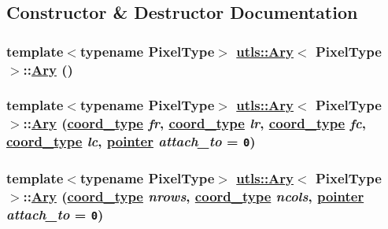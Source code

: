 \subsection{Constructor \& Destructor Documentation}
\hypertarget{structutls_1_1Ary_2c088eda97ba856c1de2555860dc0efc}{
\subsubsection[Ary]{\setlength{\rightskip}{0pt plus 5cm}template$<$typename Pixel\-Type$>$ \hyperlink{structutls_1_1Ary}{utls::Ary}$<$ Pixel\-Type $>$::\hyperlink{structutls_1_1Ary}{Ary} ()}}
\label{structutls_1_1Ary_2c088eda97ba856c1de2555860dc0efc}


\hypertarget{structutls_1_1Ary_d03b3a2394949e4f97d968ad9037dfe6}{
\subsubsection[Ary]{\setlength{\rightskip}{0pt plus 5cm}template$<$typename Pixel\-Type$>$ \hyperlink{structutls_1_1Ary}{utls::Ary}$<$ Pixel\-Type $>$::\hyperlink{structutls_1_1Ary}{Ary} (\hyperlink{structutls_1_1Ary_907420b899d180bd0ae87c3995316f18}{coord\_\-type} {\em fr}, \hyperlink{structutls_1_1Ary_907420b899d180bd0ae87c3995316f18}{coord\_\-type} {\em lr}, \hyperlink{structutls_1_1Ary_907420b899d180bd0ae87c3995316f18}{coord\_\-type} {\em fc}, \hyperlink{structutls_1_1Ary_907420b899d180bd0ae87c3995316f18}{coord\_\-type} {\em lc}, \hyperlink{structutls_1_1Ary_9eb735fe995ca9b5faaef9b176a08583}{pointer} {\em attach\_\-to} = {\tt 0})}}
\label{structutls_1_1Ary_d03b3a2394949e4f97d968ad9037dfe6}


\hypertarget{structutls_1_1Ary_ed07a325cd081be6dc5f796a0f7fd259}{
\subsubsection[Ary]{\setlength{\rightskip}{0pt plus 5cm}template$<$typename Pixel\-Type$>$ \hyperlink{structutls_1_1Ary}{utls::Ary}$<$ Pixel\-Type $>$::\hyperlink{structutls_1_1Ary}{Ary} (\hyperlink{structutls_1_1Ary_907420b899d180bd0ae87c3995316f18}{coord\_\-type} {\em nrows}, \hyperlink{structutls_1_1Ary_907420b899d180bd0ae87c3995316f18}{coord\_\-type} {\em ncols}, \hyperlink{structutls_1_1Ary_9eb735fe995ca9b5faaef9b176a08583}{pointer} {\em attach\_\-to} = {\tt 0})}}
\label{structutls_1_1Ary_ed07a325cd081be6dc5f796a0f7fd259}


